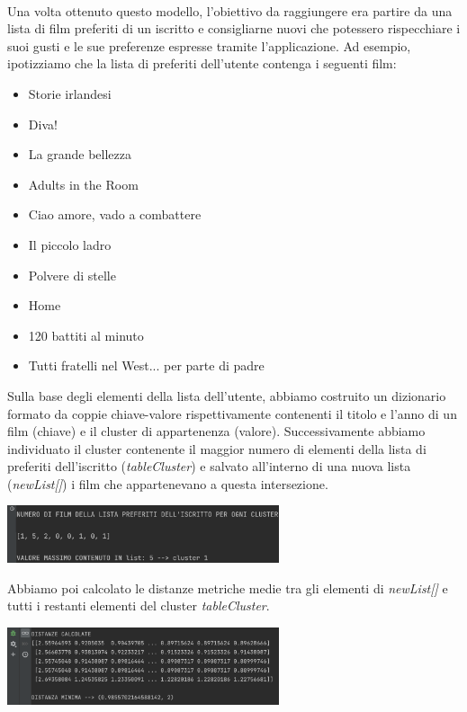 \documentclass[a4paper, 10pt]{report}
\begin{document}
            \\Una volta ottenuto questo modello, l'obiettivo da raggiungere era partire da una lista di film preferiti di un iscritto
            e consigliarne nuovi che potessero rispecchiare i suoi gusti e le sue preferenze espresse tramite l'applicazione.
            Ad esempio, ipotizziamo che la lista di preferiti dell'utente contenga i seguenti film:
            \begin{itemize}
                \item Storie irlandesi
                \item Diva!
                \item La grande bellezza
                \item Adults in the Room
                \item Ciao amore, vado a combattere
                \item Il piccolo ladro
                \item Polvere di stelle
                \item Home
                \item 120 battiti al minuto
                \item Tutti fratelli nel West... per parte di padre
            \end{itemize}
            Sulla base degli elementi della lista dell'utente, abbiamo costruito un dizionario formato da
            coppie chiave-valore rispettivamente contenenti il titolo e l'anno di un film (chiave) e il cluster di appartenenza (valore).
            Successivamente abbiamo individuato il cluster contenente il maggior numero di elementi della lista di preferiti dell'iscritto (\textit{tableCluster})
            e salvato all'interno di una nuova lista (\textit{newList[]}) i film che appartenevano a questa intersezione.
            \begin{center}
                \includegraphics[width=8cm]{modelling/numeroFilmxCluster}\\
            \end{center}

            Abbiamo poi calcolato le distanze metriche medie tra gli elementi di \textit{newList[]} e tutti i restanti elementi
            del cluster \textit{tableCluster}.
            \begin{center}
                \includegraphics[width=8cm]{modelling/distanzeMetriche}\\
            \end{center}
\end{document}

